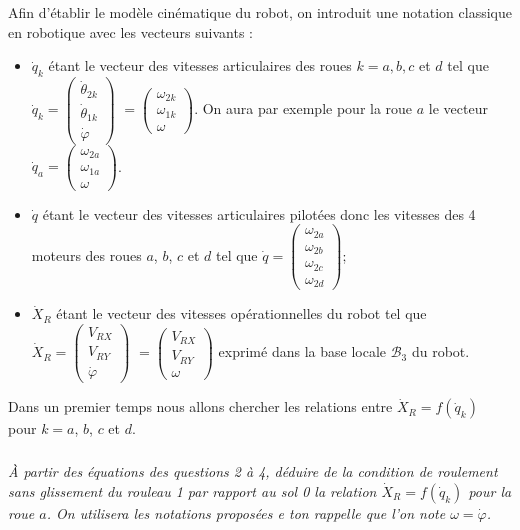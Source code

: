 \begin{multicols}{2}
Afin d'établir le modèle cinématique du robot, on introduit une notation classique en robotique avec les vecteurs suivants :
 \begin{itemize}
\item  $\dot{q}_k$ étant le vecteur des vitesses articulaires des roues $k=a,b,c$ et $d$ tel que $\dot{q}_k =\begin{pmatrix}
\dot{\theta}_{2k} \\ \dot{\theta}_{1k} \\ \dot{\varphi} \end{pmatrix} $ $=\begin{pmatrix}
\omega_{2k} \\ \omega_{1k} \\ \omega \end{pmatrix} $. On aura par exemple pour la roue $a$ le vecteur 
$\dot{q}_a =\begin{pmatrix}
\omega_{2a} \\ \omega_{1a} \\ \omega \end{pmatrix} $.
\item  $\dot{q}$ étant le vecteur des vitesses articulaires pilotées donc les vitesses des 4 moteurs des roues $a$, $b$, $c$ et $d$ tel que $\dot{q} =\begin{pmatrix}
\omega_{2a} \\ \omega_{2b}\\ \omega_{2c}\\ \omega_{2d}\end{pmatrix} $;
\item $\dot{X}_R$ étant le vecteur des vitesses opérationnelles du robot tel que $\dot{X}_R=\begin{pmatrix}
V_{RX} \\ V_{RY}\\ \dot{\varphi}\end{pmatrix} $ $=\begin{pmatrix}
V_{RX} \\ V_{RY}\\ \omega\end{pmatrix} $ exprimé dans la base locale $\mathcal{B}_3$ du robot.
 \end{itemize}


Dans un premier temps nous allons chercher les relations entre $\dot{X}_R = f\left(\dot{q}_k \right)$ pour 
$k=a$, $b$, $c$ et $d$.

\subparagraph{}
\textit{À partir des équations des questions 2 à 4, déduire de la condition de roulement sans glissement du rouleau 1 par rapport au sol 0 la relation $\dot{X}_R = f\left(\dot{q}_k \right)$  pour la roue $a$. On utilisera les notations proposées e ton rappelle que l'on note $\omega=\dot{\varphi}$.}
\ifprof%
\begin{corrige}
\end{corrige}\else\fi


\end{multicols}

